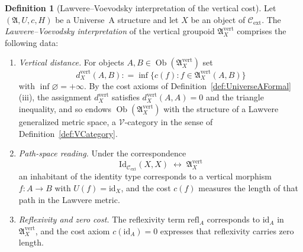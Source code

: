 \documentclass[10pt, reqno]{amsart}
\theoremstyle{plain}
\theoremstyle{definition}
\newtheorem{definition}[theorem]{Definition}
\theoremstyle{plain}
\newcommand{\coloneqq}{\mathrel{\mathop:}=}
\begin{document}
\begin{definition}[Lawvere--Voevodsky interpretation of the vertical cost]
\label{def:LawvereVoevodskyInterpretation}
Let $(\mathfrak{A},U,c,H)$ be a Universe~A structure and let $X$ be an object of $\mathcal{C}_{\mathrm{ext}}$. The \emph{Lawvere--Voevodsky interpretation} of the vertical groupoid $\mathfrak{A}_X^{\mathrm{vert}}$ comprises the following data:

\begin{enumerate}
\item[(i)] \textit{Vertical distance.} For objects $A,B \in \operatorname{Ob}(\mathfrak{A}_X^{\mathrm{vert}})$ set
\[
  d_X^{\mathrm{vert}}(A,B)
  \coloneqq
  \inf\bigl\{ c(f) : f \in \mathfrak{A}_X^{\mathrm{vert}}(A,B) \bigr\}
\]
with $\inf\varnothing = +\infty$. By the cost axioms of Definition~\ref{def:UniverseAFormal}(iii), the assignment $d_X^{\mathrm{vert}}$ satisfies $d_X^{\mathrm{vert}}(A,A) = 0$ and the triangle inequality, and so endows $\operatorname{Ob}(\mathfrak{A}_X^{\mathrm{vert}})$ with the structure of a Lawvere generalized metric space, a $\mathcal{V}$-category in the sense of Definition~\ref{def:VCategory}.

\item[(ii)] \textit{Path-space reading.} Under the correspondence
\[
  \mathrm{Id}_{\mathcal{C}_{\mathrm{ext}}}(X,X)
  \;\longleftrightarrow\;
  \mathfrak{A}_X^{\mathrm{vert}}
\]
an inhabitant of the identity type corresponds to a vertical morphism $f \colon A \to B$ with $U(f) = \mathrm{id}_X$, and the cost $c(f)$ measures the length of that path in the Lawvere metric.

\item[(iii)] \textit{Reflexivity and zero cost.} The reflexivity term $\mathrm{refl}_A$ corresponds to $\mathrm{id}_A$ in $\mathfrak{A}_X^{\mathrm{vert}}$, and the cost axiom $c(\mathrm{id}_A) = 0$ expresses that reflexivity carries zero length.
\end{enumerate}
\end{definition}
\end{document}
